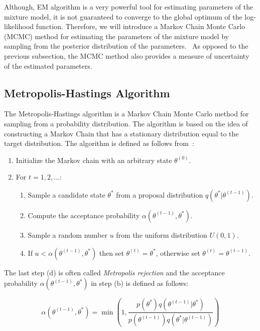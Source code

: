 Although, EM algorithm is a very powerful tool for estimating parameters of the mixture model,
it is not guaranteed to converge to the global optimum of the log-likelihood function. Therefore, 
we will introduce a Markov Chain Monte Carlo (MCMC) method for estimating the parameters of the mixture model by 
sampling from the posterior distribution of the parameters.~\citep{Speagle2020} 
As opposed to the previous subsection, the MCMC method also provides a measure of uncertainty of the estimated parameters.~\citep{Spade2020}     

\subsection{Metropolis-Hastings Algorithm}

The Metropolis-Hastings algorithm is a Markov Chain Monte Carlo method for sampling from a probability distribution. 
The algorithm is based on the idea of constructing a Markov Chain that has a stationary distribution equal to the target distribution.
The algorithm is defined as follows from~\citep{Robert2004}:

\begin{enumerate}
    \item Initialize the Markov chain with an arbitrary state $\theta^{(0)}$.
    \item For $t = 1,2,\dots$:
    \begin{enumerate}
        \item Sample a candidate state $\theta^*$ from a proposal distribution $q(\theta^*|\theta^{(t-1)})$.
        \item Compute the acceptance probability $\alpha(\theta^{(t-1)},\theta^*)$.
        \item Sample a random number $u$ from the uniform distribution $U(0,1)$.
        \item If $u < \alpha(\theta^{(t-1)},\theta^*)$ then set $\theta^{(t)} = \theta^*$, otherwise set $\theta^{(t)} = \theta^{(t-1)}$.
    \end{enumerate}
\end{enumerate}

The last step (d) is often called \textit{Metropolis rejection} and the acceptance probability $\alpha(\theta^{(t-1)},\theta^*)$ in step (b) is defined as follows:

\begin{equation} \label{eq:hastings_ratio}
    \alpha(\theta^{(t-1)},\theta^*) = \min \left(1,\frac{p(\theta^*)q(\theta^{(t-1)}|\theta^*)}{p(\theta^{(t-1)})q(\theta^*|\theta^{(t-1)})}\right)
\end{equation}

